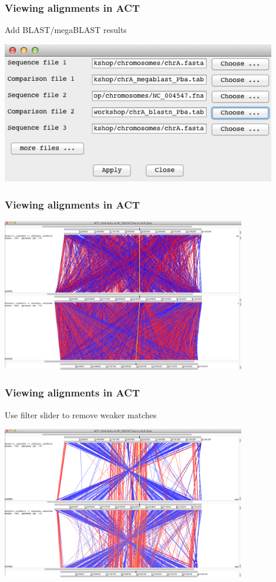 \documentclass[table]{beamer}
\begin{document}
    \begin{frame}
      \frametitle{Viewing alignments in ACT}    
      Add BLAST/megaBLAST results
      \begin{center}
        \includegraphics[width=0.9\textwidth]{images/act_wgs5}     
      \end{center}
    \end{frame} 

    \begin{frame}
      \frametitle{Viewing alignments in ACT}    
      \begin{center}
        \includegraphics[width=0.8\textwidth]{images/act_wgs6}     
      \end{center}
    \end{frame} 

    \begin{frame}
      \frametitle{Viewing alignments in ACT}    
      Use filter slider to remove weaker matches
      \begin{center}
        \includegraphics[width=0.8\textwidth]{images/act_wgs7}     
      \end{center}
    \end{frame} 
\end{document}
